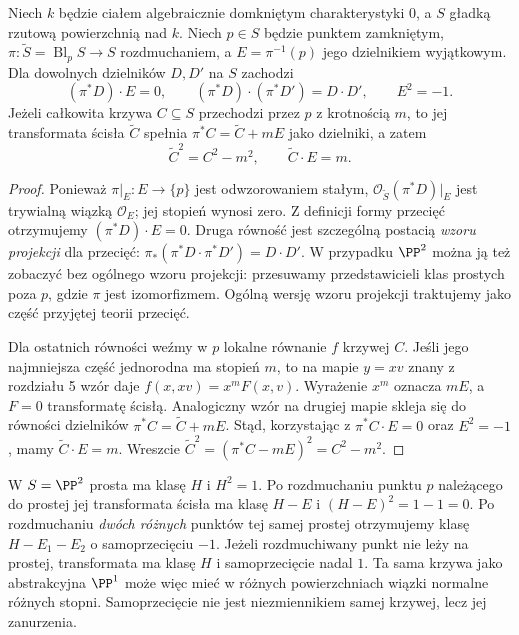 \begin{stwierdzenie}
\label{st:ga6-blowup-form}
Niech $k$ będzie ciałem algebraicznie domkniętym
charakterystyki $0$, a $S$ gładką rzutową powierzchnią
nad $k$. Niech $p\in S$ będzie punktem zamkniętym,
$\pi:\widetilde S=\operatorname{Bl}_p S\to S$
rozdmuchaniem, a $E=\pi^{-1}(p)$ jego dzielnikiem
wyjątkowym. Dla dowolnych dzielników $D,D'$ na $S$ zachodzi
\[
 (\pi^*D)\cdot E=0,\qquad
 (\pi^*D)\cdot(\pi^*D')=D\cdot D',\qquad E^2=-1.
\]
Jeżeli całkowita krzywa $C\subseteq S$ przechodzi
przez $p$ z krotnością $m$, to jej transformata ścisła
$\widetilde C$ spełnia
$\pi^*C=\widetilde C+mE$ jako dzielniki, a zatem
\[
 \widetilde C^2=C^2-m^2,\qquad
 \widetilde C\cdot E=m.
\]
\end{stwierdzenie}
\begin{proof}
Ponieważ $\pi|_E:E\to\{p\}$ jest odwzorowaniem stałym,
$\mathcal O_{\widetilde S}(\pi^*D)|_E$
jest trywialną wiązką $\mathcal O_E$;
jej stopień wynosi zero. Z definicji formy przecięć
otrzymujemy $(\pi^*D)\cdot E=0$.
Druga równość jest szczególną postacią \emph{wzoru projekcji}
dla przecięć: $\pi_*(\pi^*D\cdot\pi^*D')=D\cdot D'$.
W przypadku $\PP^2$ można ją też zobaczyć bez ogólnego
wzoru projekcji: przesuwamy przedstawicieli klas
prostych poza $p$, gdzie $\pi$ jest izomorfizmem.
Ogólną wersję wzoru projekcji traktujemy jako część
przyjętej teorii przecięć.

Dla ostatnich równości weźmy w $p$ lokalne równanie
$f$ krzywej $C$. Jeśli jego najmniejsza część
jednorodna ma stopień $m$, to na mapie $y=xv$
znany z rozdziału 5 wzór daje
$f(x,xv)=x^mF(x,v)$. Wyrażenie $x^m$ oznacza $mE$,
a $F=0$ transformatę ścisłą. Analogiczny wzór na drugiej
mapie skleja się do równości dzielników
$\pi^*C=\widetilde C+mE$. Stąd, korzystając z
$\pi^*C\cdot E=0$ oraz $E^2=-1$, mamy
$\widetilde C\cdot E=m$. Wreszcie
$\widetilde C^2=(\pi^*C-mE)^2=C^2-m^2$.
\end{proof}

\begin{przyklad}
\label{prz:ga6-blowup-curves}
W $S=\PP^2$ prosta ma klasę $H$ i $H^2=1$.
Po rozdmuchaniu punktu $p$ należącego do prostej
jej transformata ścisła ma klasę $H-E$ i
$(H-E)^2=1-1=0$. Po rozdmuchaniu \emph{dwóch różnych}
punktów tej samej prostej otrzymujemy klasę
$H-E_1-E_2$ o samoprzecięciu $-1$.
Jeżeli rozdmuchiwany punkt nie leży na prostej,
transformata ma klasę $H$ i samoprzecięcie nadal $1$.
Ta sama krzywa jako abstrakcyjna $\PP^1$ może więc
mieć w różnych powierzchniach wiązki normalne
różnych stopni. Samoprzecięcie nie jest niezmiennikiem
samej krzywej, lecz jej zanurzenia.
\end{przyklad}

